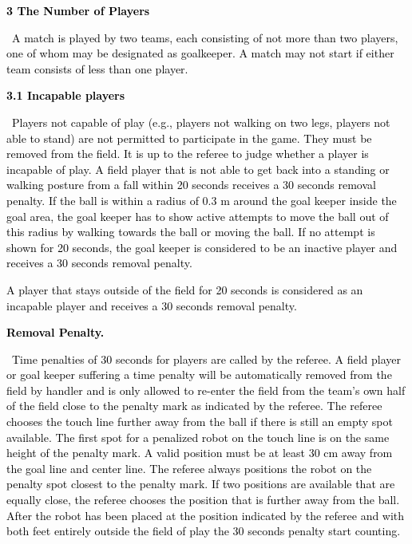 \documentclass[a4paper]{article}
\begin{document}
\textbf{\textcolor{black}{3 The Number of Players}}

\textcolor{black}{\ A match is played by two teams, each consisting of not more than two players, one of whom may be
designated as goalkeeper. A match may not start if either team consists of less than one player.}


\bigskip

\textbf{\textcolor{black}{3.1 Incapable players}}

\textcolor{black}{\ Players not capable of play (e.g., players not walking on two legs, players not able to stand) are
not permitted to participate in the game. They must be removed from the field. It is up to the referee to judge whether
a player is incapable of play. A field player that is not able to get back into a standing or walking posture from a
fall within 20 seconds receives a 30 seconds removal penalty. If the ball is within a radius of 0.3 m around the goal
keeper inside the goal area, the goal keeper has to show active attempts to move the ball out of this radius by walking
towards the ball or moving the ball. If no attempt is shown for 20 seconds, the goal keeper is considered to be an
inactive player and receives a 30 seconds removal penalty.}

\textcolor{black}{A player that stays outside of the field for 20 seconds is considered as an incapable player and
receives a 30 seconds removal penalty.}


\bigskip

\textbf{\textcolor{black}{Removal Penalty.}}

\textcolor{black}{\ Time penalties of 30 seconds for players are called by the referee. A field player or goal keeper
suffering a time penalty will be automatically removed from the field by handler and is only allowed to re-enter the
field from the team's own half of the field close to the penalty mark as indicated by the referee. The referee chooses
the touch line further away from the ball if there is still an empty spot available. The first spot for a penalized
robot on the touch line is on the same height of the penalty mark. A valid position must be at least 30 cm away from
the goal line and center line. The referee always positions the robot on the penalty spot closest to the penalty mark.
If two positions are available that are equally close, the referee chooses the position that is further away from the
ball. After the robot has been placed at the position indicated by the referee and with both feet entirely outside the
field of play the 30 seconds penalty start counting.}
\end{document}
